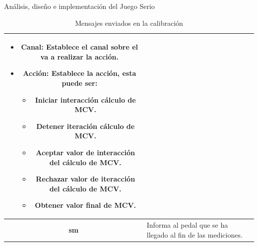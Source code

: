 \begin{thesischapter}{2} {Análisis, diseño e implementación del Juego Serio}
\begin{table}[h]
\begin{tabular}{ |c|p{14cm}|}
\begin{minipage}{14cm}
                                    \begin{itemize}
                                        \item \textbf{Canal}: Establece el canal sobre el va a realizar la acción.
                                        \item \textbf{Acción}: Establece la acción, esta puede ser: 
                                        \begin{itemize}
                                            \item Iniciar interacción cálculo de MCV.
                                            \item Detener iteración cálculo de MCV.
                                            \item Aceptar valor de interacción del cálculo de MCV.
                                            \item Rechazar valor de iteracción del cálculo de MCV.
                                            \item Obtener valor final de MCV.
                                        \end{itemize}
                                    \end{itemize} 
                                    \vspace{1pt}
                                \end{minipage}\\\hline
            \textbf{sm}     &   Informa al pedal que se ha llegado al fin de las mediciones. \\\hline               

        \end{tabular}
        \caption{Mensajes enviados en la calibración}
        \label{table:send-msg-in-calibration}
    \end{table}  


\end{thesischapter}
